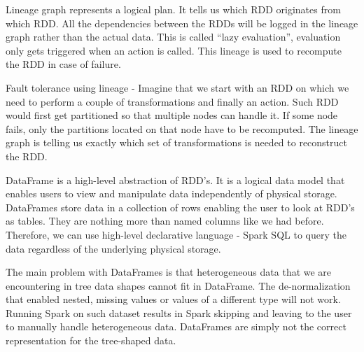 Lineage graph represents a logical plan. It tells us which RDD originates from which RDD. All the dependencies between the RDDs will be logged in the lineage graph rather than the actual data. This is called ``lazy evaluation'', evaluation only gets triggered when an action is called. This lineage is used to recompute the RDD in case of failure.

Fault tolerance using lineage - Imagine that we start with an RDD on which we need to perform a couple of transformations and finally an action. Such RDD would first get partitioned so that multiple nodes can handle it. If some node fails, only the partitions located on that node have to be recomputed. The lineage graph is telling us exactly which set of transformations is needed to reconstruct the RDD.

DataFrame is a high-level abstraction of RDD's. It is a logical data model that enables users to view and manipulate data independently of physical storage. DataFrames store data in a collection of rows enabling the user to look at RDD's as tables. They are nothing more than named columns like we had before. Therefore, we can use high-level declarative language - Spark SQL to query the data regardless of the underlying physical storage.

The main problem with DataFrames is that heterogeneous data that we are encountering in tree data shapes cannot fit in DataFrame. The de-normalization that enabled nested, missing values or values of a different type will not work. Running Spark on such dataset results in Spark skipping and leaving to the user to manually handle heterogeneous data. DataFrames are simply not the correct representation for the tree-shaped data. 

